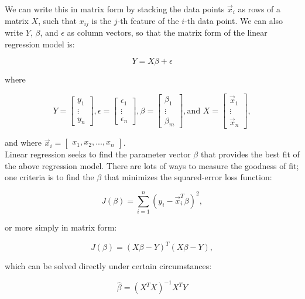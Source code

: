 \documentclass[paper=a4, fontsize=11pt]{scrartcl} %
\numberwithin{figure}{section} %
\numberwithin{table}{section} %
\begin{document}
We can write this in matrix form by stacking the data points $\vec{x}_i$ as rows of a matrix $X$, such that $x_{ij}$ is the $j$-th feature of the $i$-th data point. We can also write $Y$, $\beta$, and $\epsilon$ as column vectors, so that the matrix form of the linear regression model is:

$$
Y = X\beta + \epsilon
$$

where

$$
Y = 
\begin{bmatrix}
	y_1 \\
	\vdots \\
	y_n
\end{bmatrix},
\epsilon =
\begin{bmatrix}
	\epsilon_1 \\
	\vdots \\
	\epsilon_n
\end{bmatrix},
\beta =
\begin{bmatrix}
	\beta_1 \\
	\vdots \\
	\beta_m
\end{bmatrix},
\textrm{and } X = 
\begin{bmatrix}
	\vec{x}_1 \\
	\vdots \\
	\vec{x}_n
\end{bmatrix},
$$

and where $\vec{x}_i = \begin{bmatrix}x_1, x_2, ..., x_n\end{bmatrix}$. \\

Linear regression seeks to find the parameter vector $\beta$ that provides the best fit of the above regression model. There are lots of ways to measure the goodness of fit; one criteria is to find the $\beta$ that minimizes the squared-error loss function:

$$
J(\beta) = \sum_{i = 1}^n (y_i - \vec{x}_i^T \beta)^2,
$$

or more simply in matrix form:

\begin{equation}
J(\beta) = (X\beta - Y)^T (X\beta - Y),
\label{eq:sqerr}
\end{equation}

which can be solved directly under certain circumstances:

\begin{equation}
\hat{\beta} = (X^TX)^{-1} X^TY
\label{eq:dirsol}
\end{equation}
\end{document}
